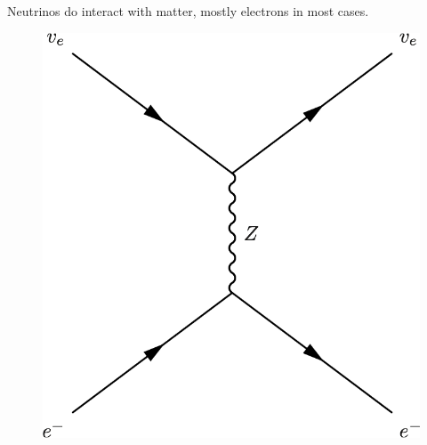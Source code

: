 \documentclass[letterpaper,12pt,english]{sphinxmanual}
\begin{document}
Neutrinos do interact with matter, mostly electrons in most cases.
\begin{figure}[htbp]
\centering

\includegraphics{nueNeutral.png}
\end{figure}
\end{document}
